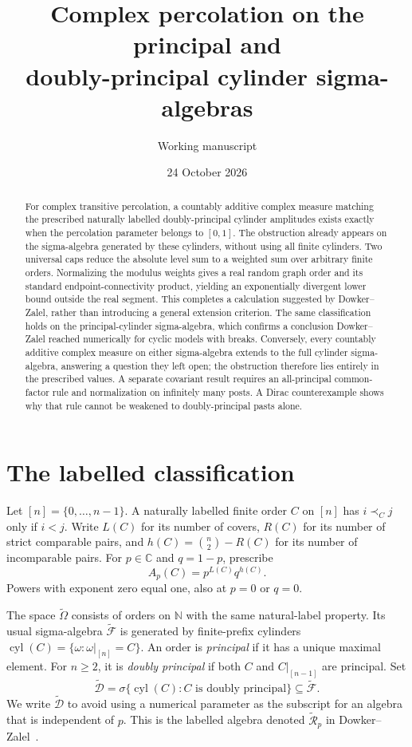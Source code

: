 \documentclass[11pt]{article}
\title{Complex percolation on the principal and\protect\\ doubly-principal cylinder sigma-algebras}
\author{Working manuscript}
\date{24 October 2026}
\theoremstyle{definition}
\newcommand{\Om}{\widetilde\Omega}
\newcommand{\F}{\widetilde{\mathcal F}}
\newcommand{\D}{\widetilde{\mathcal D}}
\newcommand{\cyl}{\operatorname{cyl}}
\begin{document}
\maketitle
\begin{abstract}
For complex transitive percolation, a countably additive complex measure
matching the prescribed naturally labelled doubly-principal cylinder
amplitudes exists exactly when the percolation parameter belongs to $[0,1]$.
The obstruction already appears on the sigma-algebra generated by these
cylinders, without using all finite cylinders. Two universal caps reduce the
absolute level sum to a weighted sum over arbitrary finite orders.
Normalizing the modulus weights gives a real random graph order and its
standard endpoint-connectivity product, yielding an exponentially divergent
lower bound outside the real segment. This completes a calculation suggested
by Dowker--Zalel, rather than introducing a general extension criterion.
The same classification holds on the principal-cylinder sigma-algebra, which
confirms a conclusion Dowker--Zalel reached numerically for cyclic models
with breaks. Conversely, every countably additive complex measure on either
sigma-algebra extends to the full cylinder sigma-algebra, answering a
question they left open; the obstruction therefore lies entirely in the
prescribed values. A separate covariant result requires an all-principal common-factor
rule and normalization on infinitely many posts. A Dirac counterexample
shows why that rule cannot be weakened to doubly-principal pasts alone.
\end{abstract}

\section{The labelled classification}
Let $[n]=\{0,\ldots,n-1\}$. A naturally labelled finite order $C$ on $[n]$
has $i\prec_C j$ only if $i<j$. Write $L(C)$ for its number of covers,
$R(C)$ for its number of strict comparable pairs, and
$h(C)=\binom n2-R(C)$ for its number of incomparable pairs. For $p\in\mathbb C$
and $q=1-p$, prescribe
\begin{equation}\label{eq:amp}
 A_p(C)=p^{L(C)}q^{h(C)}.
\end{equation}
Powers with exponent zero equal one, also at $p=0$ or $q=0$.

The space $\Om$ consists of orders on $\mathbb N$ with the same natural-label
property. Its usual sigma-algebra $\F$ is generated by finite-prefix cylinders
$\cyl(C)=\{\omega:\omega|_{[n]}=C\}$. An order is \emph{principal} if it has
a unique maximal element. For $n\ge2$, it is \emph{doubly principal} if both
$C$ and $C|_{[n-1]}$ are principal. Set
\begin{equation}\label{eq:algebra}
 \D=\sigma\{\cyl(C): C\text{ is doubly principal}\}\subseteq\F.
\end{equation}
We write $\D$ to avoid using a numerical parameter as the subscript for an
algebra that is independent of $p$. This is the labelled algebra denoted
$\widetilde{\mathcal R}_p$ in Dowker--Zalel~\cite[Sec.~V]{DZ}.
\end{document}
